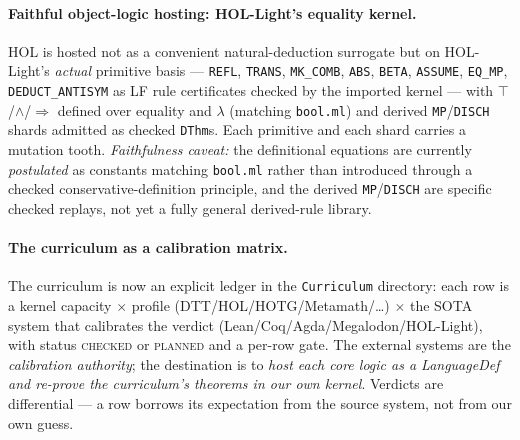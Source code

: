 \documentclass[11pt]{article}
\newcommand{\HOTG}{HOTG}
\newcommand{\DTT}{DTT}
\newcommand{\code}[1]{\texttt{#1}}
\begin{document}
\paragraph{Faithful object-logic hosting: HOL-Light's equality kernel.} HOL is hosted
not as a convenient natural-deduction surrogate but on HOL-Light's \emph{actual}
primitive basis --- \code{REFL}, \code{TRANS}, \code{MK\_COMB}, \code{ABS}, \code{BETA},
\code{ASSUME}, \code{EQ\_MP}, \code{DEDUCT\_ANTISYM} as LF rule certificates checked by
the imported kernel --- with $\top$/$\wedge$/$\Rightarrow$ defined over equality and
$\lambda$ (matching \code{bool.ml}) and derived \code{MP}/\code{DISCH} shards admitted as
checked \code{DThm}s. Each primitive and each shard carries a mutation tooth.
\emph{Faithfulness caveat:} the definitional equations are currently \emph{postulated}
as constants matching \code{bool.ml} rather than introduced through a checked
conservative-definition principle, and the derived \code{MP}/\code{DISCH} are specific
checked replays, not yet a fully general derived-rule library.

\paragraph{The curriculum as a calibration matrix.} The curriculum is now an explicit
ledger in the \code{Curriculum} directory: each row is a kernel capacity $\times$
profile (\DTT{}/HOL/\HOTG{}/Metamath/\dots) $\times$ the SOTA system that calibrates the
verdict (Lean/Coq/Agda/Megalodon/HOL-Light), with status \textsc{checked} or
\textsc{planned} and a per-row gate. The external systems are the \emph{calibration
authority}; the destination is to \emph{host each core logic as a LanguageDef and re-prove
the curriculum's theorems in our own kernel}. Verdicts are differential --- a row
borrows its expectation from the source system, not from our own guess.
\end{document}
